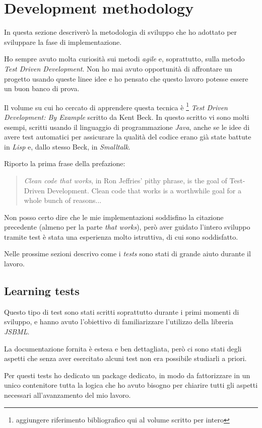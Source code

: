 \section{Development methodology}

In questa sezione descriver\`o la metodologia di sviluppo che ho
adottato per sviluppare la fase di implementazione.

Ho sempre avuto molta curiosit\`a sui metodi \emph{agile} e,
soprattutto, sulla metodo \emph{Test Driven Development}. Non ho mai
avuto opportunit\`a di affrontare un progetto usando queste linee idee
e ho pensato che questo lavoro potesse essere un buon banco di prova.

Il volume su cui ho cercato di apprendere questa tecnica \`e
\footnote{aggiungere riferimento bibliografico qui al volume scritto
  per intero} \emph{Test Driven Development: By Example} scritto da
Kent Beck. In questo scritto vi sono molti esempi, scritti usando il
linguaggio di programmazione \emph{Java}, anche se le idee di avere
test automatici per assicurare la qualit\`a del codice erano gi\`a
state battute in \emph{Lisp} e, dallo stesso Beck, in
\emph{Smalltalk}.

Riporto la prima frase della prefazione:
\begin{quotation}
  \emph{Clean code that works}, in Ron Jeffries' pithy phrase, is the
  goal of Test-Driven Development. Clean code that works is a
  worthwhile goal for a whole bunch of reasons...
\end{quotation}
Non posso certo dire che le mie implementazioni soddisfino la
citazione precedente (almeno per la parte \emph{that works}), per\`o
aver guidato l'intero sviluppo tramite test \`e stata una esperienza
molto istruttiva, di cui sono soddisfatto.

Nelle prossime sezioni descrivo come i \emph{tests} sono stati di
grande aiuto durante il lavoro.

\subsection{Learning tests}
Questo tipo di test sono stati scritti soprattutto durante i primi
momenti di sviluppo, e hanno avuto l'obiettivo di
familiarizzare l'utilizzo della libreria \emph{JSBML}. 

La documentazione fornita \`e estesa e ben dettagliata, per\`o ci
sono stati degli aspetti che senza aver esercitato alcuni test non era
possibile studiarli a priori.

Per questi tests ho dedicato un package dedicato, in modo da
fattorizzare in un unico contenitore tutta la logica che ho avuto
bisogno per chiarire tutti gli aspetti necessari all'avanzamento del
mio lavoro.

